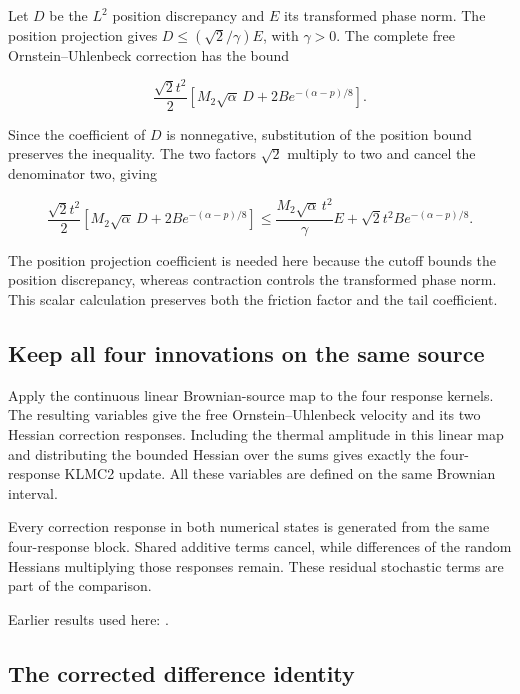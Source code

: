 \documentclass[11pt,a4paper]{report}
\begin{document}
Let \(D\) be the \(L^2\) position discrepancy and \(E\) its transformed phase norm. The position projection gives \(D\le(\sqrt2/\gamma)E\), with \(\gamma>0\). The complete free Ornstein–Uhlenbeck correction has the bound

\[\frac{\sqrt2t^2}{2}\left[M_2\sqrt\alpha\,D+2B e^{-(\alpha-p)/8}\right].\]

Since the coefficient of \(D\) is nonnegative, substitution of the position bound preserves the inequality. The two factors \(\sqrt2\) multiply to two and cancel the denominator two, giving

\[\frac{\sqrt2t^2}{2}\left[M_2\sqrt\alpha\,D+2B e^{-(\alpha-p)/8}\right]\le\frac{M_2\sqrt\alpha\,t^2}{\gamma}E+\sqrt2t^2B e^{-(\alpha-p)/8}.\]

The position projection coefficient is needed here because the cutoff bounds the position discrepancy, whereas contraction controls the transformed phase norm. This scalar calculation preserves both the friction factor and the tail coefficient.

\subsection{\texorpdfstring{Keep all four innovations on the same source}{Keep all four innovations on the same source}}
\label{report-step-KineticLangevin-SecondOrderComparison-lean-3}


Apply the continuous linear Brownian-source map to the four response kernels. The resulting variables give the free Ornstein–Uhlenbeck velocity and its two Hessian correction responses. Including the thermal amplitude in this linear map and distributing the bounded Hessian over the sums gives exactly the four-response KLMC2 update. All these variables are defined on the same Brownian interval.



Every correction response in both numerical states is generated from the same four-response block. Shared additive terms cancel, while differences of the random Hessians multiplying those responses remain. These residual stochastic terms are part of the comparison.



Earlier results used here: \cite[Section~3.8.17]{LangevinLean2026ULASC}.
\subsection{\texorpdfstring{The corrected difference identity}{The corrected difference identity}}
\label{report-step-KineticLangevin-SecondOrderComparison-lean-4}
\end{document}
